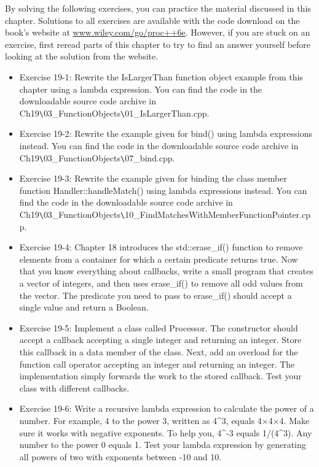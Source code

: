 By solving the following exercises, you can practice the material discussed in this chapter. Solutions to all exercises are available with the code download on the book’s website at \url{www.wiley.com/go/proc++6e}. However, if you are stuck on an exercise, first reread parts of this chapter to try to find an answer yourself before looking at the solution from the website.

\begin{itemize}
\item
Exercise 19-1: Rewrite the IsLargerThan function object example from this chapter using a lambda expression. You can find the code in the downloadable source code archive in Ch19\verb|\|03\_FunctionObjects\verb|\|01\_IsLargerThan.cpp.

\item
Exercise 19-2: Rewrite the example given for bind() using lambda expressions instead. You can find the code in the downloadable source code archive in Ch19\verb|\|03\_FunctionObjects\verb|\|07\_bind.cpp.

\item
Exercise 19-3: Rewrite the example given for binding the class member function Handler::handleMatch() using lambda expressions instead. You can find the code in the downloadable source code archive in Ch19\verb|\|03\_FunctionObjects\verb|\|10\_FindMatchesWithMemberFunctionPointer.cpp.

\item
Exercise 19-4: Chapter 18 introduces the std::erase\_if() function to remove elements from a container for which a certain predicate returns true. Now that you know everything about callbacks, write a small program that creates a vector of integers, and then uses erase\_if() to remove all odd values from the vector. The predicate you need to pass to erase\_if() should accept a single value and return a Boolean.

\item
Exercise 19-5: Implement a class called Processor. The constructor should accept a callback accepting a single integer and returning an integer. Store this callback in a data member of the class. Next, add an overload for the function call operator accepting an integer and returning an integer. The implementation simply forwards the work to the stored callback. Test your class with different callbacks.

\item
Exercise 19-6: Write a recursive lambda expression to calculate the power of a number. For example, 4 to the power 3, written as 4\^{}3, equals 4×4×4. Make sure it works with negative exponents. To help you, 4\^{}-3 equals 1/(4\^{}3). Any number to the power 0 equals 1. Test your lambda expression by generating all powers of two with exponents between -10 and 10.
\end{itemize}
